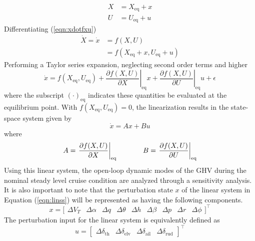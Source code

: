 \begin{equation}
  \begin{split}
    X&=X_{\text{eq}}+x \\
    U&=U_{\text{eq}}+u
  \end{split}
\end{equation}
Differentiating (\ref{eqn:xdotfxu})
\begin{equation}
  \begin{split}
    \dot{X}=\dot{x}&=f(X, U) \\
    &=f(X_{\text{eq}}+x,U_{\text{eq}}+u)
  \end{split}
\end{equation}
Performing a Taylor series expansion, neglecting second order terms and higher
\begin{equation*}
  \dot{x}= f(X_{\text{eq}},U_{\text{eq}})+\left.\frac{\partial f(X,U)}{\partial X}\right|_{\text{eq}}x+\left.\frac{\partial f(X,U)}{\partial U}\right|_{\text{eq}}u+\epsilon
\end{equation*}
where the subscript $(\cdot)_{\text{eq}}$ indicates these quantities be evaluated at the equilibrium point.
With $f(X_{\text{eq}},U_{\text{eq}})=0$, the linearization results in the state-space system given by
\begin{equation}
  \label{eqn:linss}
  \dot{x}=Ax+Bu
\end{equation}
where
\begin{equation}
  A=\left.\frac{\partial f(X,U)}{\partial X}\right|_{\text{eq}}^{}
  \hspace{0.5in}
  B=\left.\frac{\partial f(X,U)}{\partial U}\right|_{\text{eq}}^{}
\end{equation}
Using this linear system, the open-loop dynamic modes of the GHV during the nominal steady level cruise condition are analyzed through a sensitivity analysis.
It is also important to note that the perturbation state $x$ of the linear system in Equation (\ref{eqn:linss}) will be represented as having the following components.
\begin{equation}
  x=\bigr[
  \begin{array}{ccccccccc}
    \Delta V_{T} & \Delta\alpha & \Delta q & \Delta\theta & \Delta h & \Delta\beta & \Delta p & \Delta r & \Delta\phi
  \end{array}\bigr]^{\top}
\end{equation}
The perturbation input for the linear system is equivalently defined as
\begin{equation}
  u=\left[
  \begin{array}{cccc}
    \Delta\delta_{\text{th}} & \Delta\delta_{\text{elv}} & \Delta\delta_{\text{ail}} & \Delta\delta_{\text{rud}}
  \end{array}\right]^{\top}
\end{equation}
